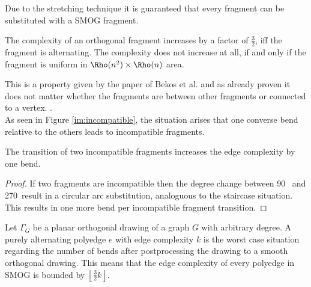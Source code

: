 Due to the stretching technique it is guaranteed that every fragment can be substituted with a SMOG fragment.
\begin{lemma}
	The complexity of an orthogonal fragment increases by a factor of $\frac{3}{2}$, iff the fragment is alternating. The complexity does not increase at all, if and only if the fragment is uniform in $\Rho(n^2)\times\Rho(n)$ area.\label{lem:edgebounds}
\end{lemma}
This is a property given by the paper of Bekos et al. and as already proven it does not matter whether the fragments are between other fragments or connected to a vertex. \cite[Figure 6, p. 584]{SMOG}.\\
As seen in Figure \ref{im:incompatible}, the situation arises that one converse bend relative to the others leads to incompatible fragments.
\begin{lemma}
	The transition of two incompatible fragments increases the edge complexity by one bend.\label{lem:transition}
\end{lemma}
\begin{proof}
	If two fragments are incompatible then the degree change between 90\degree~ and 270\degree~result in a circular arc substitution, analoguous to the staircase situation. This results in one more bend per incompatible fragment transition.
\end{proof}
\begin{lemma}
	Let $\Gamma_G$ be a planar orthogonal drawing of a graph $G$ with arbitrary degree. A purely alternating polyedge $e$ with edge complexity $k$ is the worst case situation regarding the number of bends after postprocessing the drawing to a smooth orthogonal drawing. This means that the edge complexity of every polyedge in SMOG is bounded by $\left\lfloor\frac{3}{2}k\right\rfloor$. \label{lem:ec_bound}
\end{lemma}
